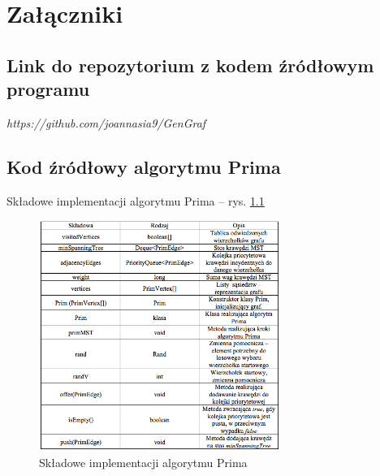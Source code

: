 \setcounter{secnumdepth}{-1}

\chapter{Załączniki}
\fancyhead[L]{}
\fancyhead[R]{}
\setcounter{secnumdepth}{3}

\setcounter{section}{0}
\renewcommand{\thesection}{\arabic{section}}
\newcommand{\CDlitera}{$\Xi$/}

\section{Link do repozytorium z kodem źródłowym programu}
\begin{center}
	\emph{https://github.com/joannasia9/GenGraf}
\end{center}

\section{Kod źródłowy algorytmu Prima}
Składowe implementacji algorytmu Prima -- rys. \ref{fig: sp}
\begin{figure}[htb!]
	\centering
	\includegraphics[width=0.7\textwidth]{tex/fig/padd0}
	\caption{Składowe implementacji algorytmu Prima }
	\label{fig: sp}
\end{figure}



